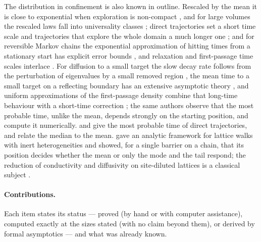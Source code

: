 The distribution in confinement is also known in outline. Rescaled by the mean it is close to exponential when
exploration is non-compact \citep{Benichou2010}, and for large volumes the rescaled laws fall into universality classes
\citep{Meyer2011}; direct trajectories set a short time scale and
trajectories that explore the whole domain a much longer one \citep{GodecMetzler2016}; and for reversible Markov
chains the exponential approximation of hitting times from a stationary start has explicit error bounds
\citep{AldousBrown1992,AldousFill}, and relaxation and first-passage time scales interlace
\citep{HartichGodec2018,HartichGodec2019}. For diffusion to a small target the slow decay rate follows from the
perturbation of eigenvalues by a small removed region \citep{WardKeller1993}, the mean time to a small target on a
reflecting boundary has an extensive asymptotic theory \citep{HolcmanSchuss2014}, and uniform
approximations of the first-passage density combine that long-time behaviour with a short-time correction
\citep{IsaacsonNewby2013}; the same authors observe that the most probable time, unlike the mean, depends strongly
on the starting position, and compute it numerically. \citet{GodecMetzler2016} and \citet{Grebenkov2018} give the
most probable time of direct trajectories, and \citet{Grebenkov2018} relate the median to the mean.
\citet{SarvaharmanGiuggioli2023} gave an analytic framework for lattice walks with inert heterogeneities and showed, for
a single barrier on a chain, that its position decides whether the mean or only the mode and the tail respond; the
reduction of conductivity and diffusivity on site-diluted
lattices is a classical subject \citep{Kirkpatrick1973,WatsonLeath1974,Nieuwenhuizen1986,Ernst1987,HavlinBenAvraham1987}.

\paragraph{Contributions.}
Each item states its status --- proved (by hand or with computer assistance), computed exactly at the sizes stated
(with no claim beyond them), or derived by formal asymptotics --- and what was already known.

